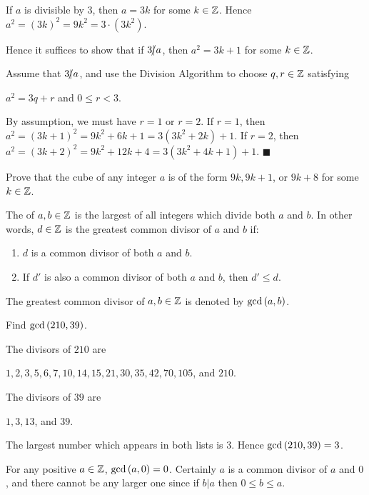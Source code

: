 \documentclass[11pt,fleqn,dvipsnames,usenames]{article}
\newcommand{\p}{\noindent}
\newcommand{\ENDPRF}{\hfill $\blacksquare$}
\begin{document}
\solution If $a$ is divisible by $3$, then $a = 3k$ for some $k\in\mathbb{Z}$.  Hence $a^2 = (3k)^2 = 9k^2 =  3\cdot (3k^2)$.
\vsp

\p Hence it suffices to show that if $3|\kern-0.9ex{/} a$, then $a^2 = 3k +1$ for some $k\in\mathbb{Z}$.
\vsp

\p Assume that $3|\kern-0.9ex{/} a$, and use the Division Algorithm to choose $q,r\in\mathbb{Z}$ satisfying
\begin{center}
$a^2 = 3q + r$ and $0 \leq r < 3$.
\end{center}
\p By assumption, we must have $r=1$ or $r=2$.  If $r = 1$, then $a^2 = (3k+1)^2 = 9k^2 + 6k + 1 = 3(3k^2 + 2k) + 1$.  If $r = 2$, then $a^2 = (3k+2)^2 = 9k^2 + 12k + 4 = 3(3k^2 + 4k + 1) + 1$. \ENDPRF
\vsp

\begin{exercise}
Prove that the cube of any integer $a$ is of the form $9k, 9k+1$, or $9k+8$ for some $k\in\mathbb{Z}$.
\end{exercise}

 The  of $a,b\in\mathbb{Z}$ is the largest of all integers which divide both $a$ and $b$.  In other words, $d\in\mathbb{Z}$ is the greatest common divisor of $a$ and $b$ if:
\begin{enumerate}[(1)]
\item $d$ is a common divisor of both $a$ and $b$.
\item If $d'$ is also a common divisor of both $a$ and $b$, then $d'\leq d$.
\end{enumerate}
\vsp

\notation The greatest common divisor of $a,b\in\mathbb{Z}$ is denoted by $\text{gcd}\left(a,b\right)$.
\vsp

\begin{example}
Find $\text{gcd}\left(210,39\right)$.
\end{example}

\solution The divisors of $210$ are
\begin{center}
$1,2,3,5,6,7,10, 14, 15, 21, 30, 35, 42, 70, 105$, and $210$.
\end{center}
The divisors of $39$ are
\begin{center}
$1,3,13$, and $39$.
\end{center}
\p The largest number which appears in both lists is $3$.  Hence $\text{gcd}\left(210,39\right) = 3$.
\vsp

\begin{example}
For any positive $a\in\mathbb{Z}$, $\text{gcd}\left(a,0\right) = 0$.  Certainly $a$ is a common divisor of $a$ and $0$, and there cannot be any larger one since if $b|a$ then $0\leq b\leq a$.
\end{example}
\end{document}
